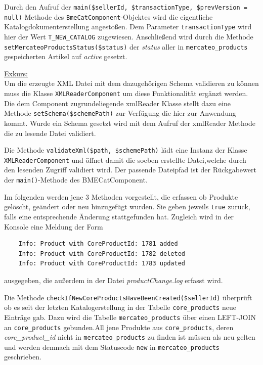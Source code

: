 	Durch den Aufruf der \texttt{main(\$sellerId, \$transactionType, \$prevVersion = null)} Methode des \texttt{BmeCatComponent}-Objektes wird die eigentliche Katalogdokumenterstellung angestoßen. Dem Parameter \texttt{transactionType} wird hier der Wert \texttt{T\_NEW\_CATALOG} zugewiesen. Anschließend wird durch die Methode \texttt{setMercateoProductsStatus(\$status)} der \textit{status} aller in \texttt{mercateo\_products} gespeicherten Artikel auf \textit{active} gesetzt.

	\begin{addmargin}[1cm]{1cm}
	\underline{Exkurs:}\\
	Um die erzeugte XML Datei mit dem dazugehörigen Schema validieren zu können muss die Klasse \texttt{XMLReaderComponent} um diese Funktionalität ergänzt werden. Die dem Component zugrundeliegende xmlReader Klasse stellt dazu eine Methode \texttt{setSchema(\$schemePath)} zur Verfügung die hier zur Anwendung kommt. Wurde ein Schema gesetzt wird mit dem Aufruf der xmlReader Methode  die zu lesende Datei validiert. 
	\end{addmargin}
	
	Die Methode \texttt{validateXml(\$path, \$schemePath)} lädt eine Instanz der Klasse \texttt{XMLReaderComponent} und öffnet damit die soeben erstellte Datei,welche durch den lesenden Zugriff validiert wird. Der passende Dateipfad ist der Rückgabewert der \texttt{main()}-Methode des BMECatComponent.
	
	Im folgenden werden jene 3 Methoden vorgestellt, die erfassen ob Produkte gelöscht, geändert oder neu hinzugefügt wurden. Sie geben jeweils \texttt{true} zurück, falls eine entsprechende Änderung stattgefunden hat. Zugleich wird in der Konsole eine Meldung der Form 	
	\begin{lstlisting}
	Info: Product with CoreProductId: 1781 added
	Info: Product with CoreProductId: 1782 deleted
	Info: Product with CoreProductId: 1783 updated
	\end{lstlisting} ausgegeben, die außerdem in der Datei \textit{productChange.log} erfasst wird.
		
	Die Methode \texttt{checkIfNewCoreProductsHaveBeenCreated(\$sellerId)} überprüft ob es seit der letzten Katalogerstellung in der Tabelle \texttt{core\_products} neue Einträge gab. Dazu wird die Tabelle \texttt{mercateo\_products} über einen LEFT-JOIN an \texttt{core\_products} gebunden.All jene Produkte aus \texttt{core\_products}, deren \textit{core\_product\_id} nicht in \texttt{mercateo\_products} zu finden ist müssen als neu gelten und werden demnach mit dem Statuscode \texttt{new} in \texttt{mercateo\_products} geschrieben. 
	

